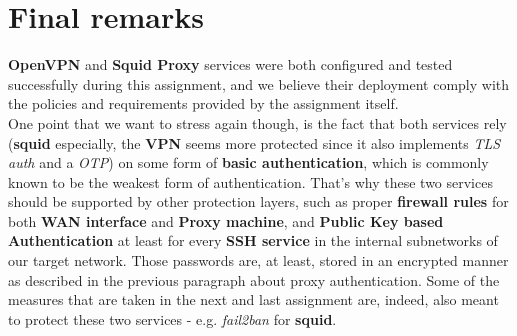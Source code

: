 \section{Final remarks}
\textbf{OpenVPN} and \textbf{Squid Proxy} services were both configured and tested successfully during this assignment, and we believe their deployment comply with the policies and requirements provided by the assignment itself.\\
One point that we want to stress again though, is the fact that both services rely (\textbf{squid} especially, the \textbf{VPN} seems more protected since it also implements \textit{TLS auth} and a \textit{OTP}) on some form of \textbf{basic authentication}, which is commonly known to be the weakest form of authentication. That's why these two services should be supported by other protection layers, such as proper \textbf{firewall rules} for both \textbf{WAN interface} and \textbf{Proxy machine}, and \textbf{Public Key based Authentication} at least for every \textbf{SSH service} in the internal subnetworks of our target network. Those passwords are, at least, stored in an encrypted manner as described in the previous paragraph about proxy authentication.
Some of the measures that are taken in the next and last assignment are, indeed, also meant to protect these two services - e.g. \textit{fail2ban} for \textbf{squid}.\\
